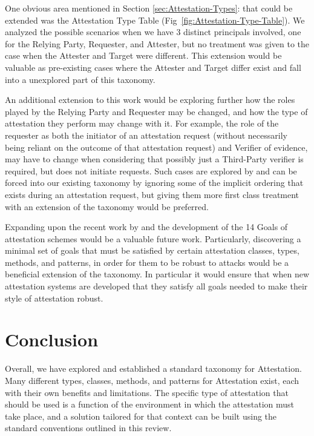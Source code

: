 \documentclass[acmsmall]{acmart}
\theoremstyle{definition}
\newcommand{\secref}[1]{Section \ref{#1}: \nameref{#1}}
\begin{document}
One obvious area mentioned in \secref{sec:Attestation-Types} that could be extended was
the Attestation Type Table (Fig~\ref{fig:Attestation-Type-Table}).
We analyzed the possible scenarios when we have 3 distinct principals involved,
one for the Relying Party, Requester, and Attester,
but no treatment was given to the case when the Attester and Target were different.
This extension would be valuable as pre-existing cases where the Attester and Target
differ exist and fall into a unexplored part of this taxonomy.

An additional extension to this work would be exploring further how the
roles played by the Relying Party and Requester may be changed, and how
the type of attestation they perform may change with it.
For example, the role of the requester as both the initiator of an
attestation request (without necessarily being reliant on the outcome
of that attestation request) and Verifier of evidence, may have to change when considering that
possibly just a Third-Party verifier is required, but does not initiate
requests. Such cases are explored by \citet{helble2021flexible,Brickell:04:Direct-anonymou}
and can be forced into our existing taxonomy by
ignoring some of the implicit ordering that exists during an attestation request, but giving them more first class
treatment with an extension of the taxonomy would be
preferred.

Expanding upon the recent work by \citet{Usman:2023:Attestation-Assurance-Arguments} and
the development of the 14 Goals of attestation schemes would be a valuable future work.
Particularly, discovering a minimal set of goals that must be satisfied by certain attestation
classes, types, methods, and patterns, in order for them to be robust to attacks
would be a beneficial extension of the taxonomy.
In particular it would ensure that when new attestation systems are developed
that they satisfy all goals needed to make their style of attestation robust.

\section{Conclusion}
\label{sec:Conclusion}

Overall, we have explored and established a standard taxonomy for Attestation.
Many different types, classes, methods, and patterns for Attestation exist, 
each with their own benefits and limitations.
The specific type of attestation that should be used is a function of the 
environment in which the attestation must take place, and a solution 
tailored for that context can be built using the standard conventions
outlined in this review.



%
% 
%
\newpage
%

%


%
\end{document}
